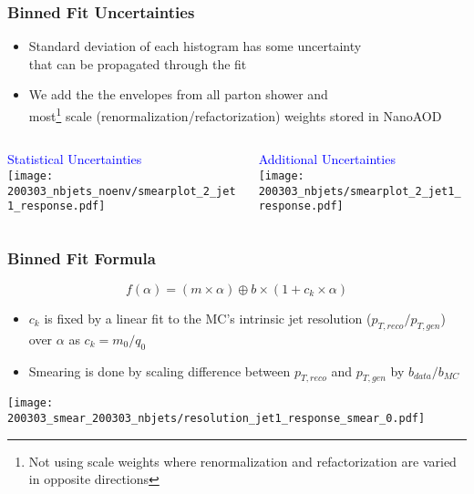 \documentclass{beamer}
\begin{document}
\begin{frame}
  \frametitle{Binned Fit Uncertainties}

  \begin{itemize}
  \item Standard deviation of each histogram has some uncertainty \\
    that can be propagated through the fit
  \item We add the the envelopes from all parton shower and \\
    most\footnote{Not using scale weights where renormalization and refactorization are varied in opposite directions} scale (renormalization/refactorization) weights stored in NanoAOD
  \end{itemize}

  \begin{columns}
    \begin{column}{0.5\linewidth}
      \centering
      \textcolor{blue}{Statistical Uncertainties} \\
      \texttt{[image: 200303\_nbjets\_noenv/smearplot\_2\_jet1\_response.pdf]}
    \end{column}
    \begin{column}{0.5\linewidth}
      \centering
      \textcolor{blue}{Additional Uncertainties} \\
      \texttt{[image: 200303\_nbjets/smearplot\_2\_jet1\_response.pdf]}
    \end{column}
  \end{columns}

\end{frame}


\begin{frame}
  \frametitle{Binned Fit Formula}

  \[
  f(\alpha) = (m \times \alpha) \oplus b \times (1 + c_k \times \alpha)
  \]

  \begin{itemize}
  \item $c_k$ is fixed by a linear fit to the MC's intrinsic jet resolution ($p_{T, reco}/p_{T, gen}$) over $\alpha$ as $c_k = m_0/q_0$
  \item Smearing is done by scaling difference between $p_{T,reco}$ and $p_{T,gen}$ by $b_{data}/b_{MC}$
  \end{itemize}

  \centering
  \texttt{[image: 200303\_smear\_200303\_nbjets/resolution\_jet1\_response\_smear\_0.pdf]}

\end{frame}
\end{document}
